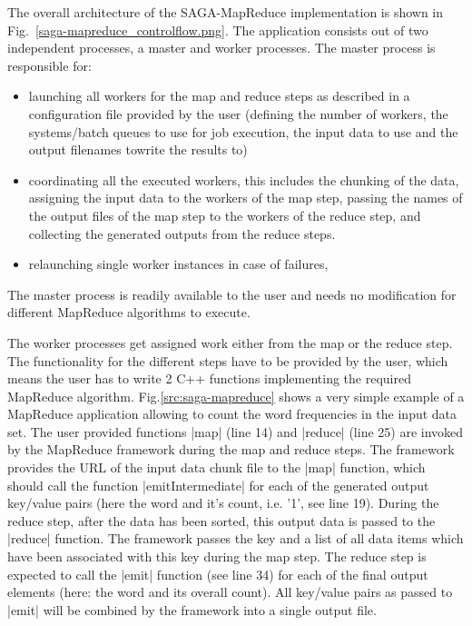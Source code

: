 \documentclass[conference,final]{IEEEtran}
\begin{document}
The overall architecture of the SAGA-MapReduce implementation is shown in 
Fig.~\ref{saga-mapreduce_controlflow.png}. The application consists out of two independent
processes, a master and worker processes. The master process is responsible for:

\begin{itemize}
	\item launching all workers for the map and reduce steps as described in a configuration 
	      file provided by the user (defining the number of workers, the systems/batch queues 
	      to use for job execution, the input data to use and the output filenames towrite 
	      the results to)
  \item coordinating all the executed workers, this includes the chunking of the data,
        assigning the input data to the workers of the map step, passing the names of the
        output files of the map step to the workers of the reduce step, and collecting 
        the generated outputs from the reduce steps.
  \item relaunching single worker instances in case of failures, 
\end{itemize}

The master process is readily available to the user and needs no modification for 
different MapReduce algorithms to execute.

The worker processes get assigned work either from the map or the reduce step. The 
functionality for the different steps have to be provided by the user, which means 
the user has to write 2 C++ functions implementing the required MapReduce algorithm.
Fig.\ref{src:saga-mapreduce} shows a very simple example of a MapReduce application
allowing to count the word frequencies in the input data set. The user provided
functions |map| (line 14) and |reduce| (line 25) are invoked by the MapReduce 
framework during the map and reduce steps. The framework provides the URL of the
input data chunk file to the |map| function, which should call the function 
|emitIntermediate| for each of the generated output key/value pairs (here the word
and it's count, i.e. '1', see line 19). During the reduce step, after the data has 
been sorted, this output data is passed to 
the |reduce| function. The framework passes the key and a list of all data items
which have been associated with this key during the map step. The reduce step
is expected to call the |emit| function (see line 34) for each of the final 
output elements (here: the word and its overall count). All key/value pairs as 
passed to |emit| will be combined by the framework into a single output file.
\end{document}
